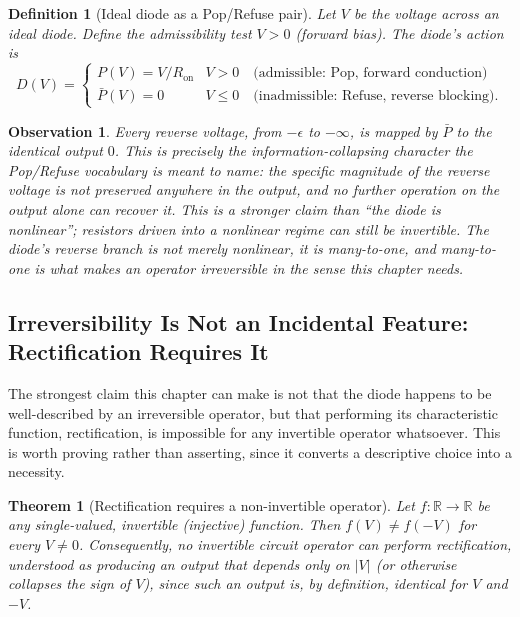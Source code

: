 \documentclass[12pt]{article}
\newtheorem{definition}{Definition}
\newtheorem{theorem}{Theorem}
\newtheorem{observation}{Observation}
\begin{document}
\begin{definition}[Ideal diode as a Pop/Refuse pair]
Let $V$ be the voltage across an ideal diode. Define the admissibility test $V > 0$ (forward bias). The diode's action is
\[
D(V) = \begin{cases} P(V) = V/R_{\text{on}} & V > 0 \quad \text{(admissible: Pop, forward conduction)} \\ \bar P(V) = 0 & V \leq 0 \quad \text{(inadmissible: Refuse, reverse blocking)}. \end{cases}
\]
\end{definition}

\begin{observation}
Every reverse voltage, from $-\epsilon$ to $-\infty$, is mapped by $\bar P$ to the identical output $0$. This is precisely the information-collapsing character the Pop/Refuse vocabulary is meant to name: the specific magnitude of the reverse voltage is not preserved anywhere in the output, and no further operation on the output alone can recover it. This is a stronger claim than ``the diode is nonlinear''; resistors driven into a nonlinear regime can still be invertible. The diode's reverse branch is not merely nonlinear, it is many-to-one, and many-to-one is what makes an operator irreversible in the sense this chapter needs.
\end{observation}

\subsection{Irreversibility Is Not an Incidental Feature: Rectification Requires It}

The strongest claim this chapter can make is not that the diode happens to be well-described by an irreversible operator, but that performing its characteristic function, rectification, is impossible for any invertible operator whatsoever. This is worth proving rather than asserting, since it converts a descriptive choice into a necessity.

\begin{theorem}[Rectification requires a non-invertible operator]
Let $f: \mathbb{R} \to \mathbb{R}$ be any single-valued, invertible (injective) function. Then $f(V) \neq f(-V)$ for every $V \neq 0$. Consequently, no invertible circuit operator can perform rectification, understood as producing an output that depends only on $|V|$ (or otherwise collapses the sign of $V$), since such an output is, by definition, identical for $V$ and $-V$.
\end{theorem}
\end{document}
